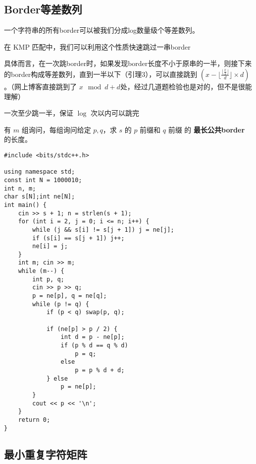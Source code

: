 \subsection{Border等差数列}
\par \noindent 一个字符串的所有border可以被我们分成log数量级个等差数列。
~\\
\par \noindent 在 KMP 匹配中，我们可以利用这个性质快速跳过一串border
~\\
\par \noindent 具体而言，在一次跳border时，如果发现border长度不小于原串的一半，则接下来的border构成等差数列，直到一半以下（引理3），可以直接跳到 $(x−\lfloor\frac{\lfloor\frac{x}{2}\rfloor}{d}\rfloor×d)$。（网上博客直接跳到了 $x\mod d+d$处，经过几道题检验也是对的，但不是很能理解）
~\\
\par \noindent 一次至少跳一半，保证 $\log$ 次以内可以跳完
~\\
\begin{tcolorbox}
\par 有 $m$ 组询问，每组询问给定 $p, q$，求 $s$ 的 $p$ 前缀和 $q$ 前缀 的 \textbf{最长公共border} 的长度。
\end{tcolorbox}
\begin{verbatim}
#include <bits/stdc++.h>

using namespace std;
const int N = 1000010;
int n, m;
char s[N];int ne[N];
int main() {
    cin >> s + 1; n = strlen(s + 1);
    for (int i = 2, j = 0; i <= n; i++) {
        while (j && s[i] != s[j + 1]) j = ne[j];
        if (s[i] == s[j + 1]) j++;
        ne[i] = j;
    }
    int m; cin >> m;
    while (m--) {
        int p, q;
        cin >> p >> q;
        p = ne[p], q = ne[q];
        while (p != q) {
            if (p < q) swap(p, q);

            if (ne[p] > p / 2) {
                int d = p - ne[p];
                if (p % d == q % d)
                    p = q;
                else
                    p = p % d + d;
            } else
                p = ne[p];
        }
        cout << p << '\n';
    }
    return 0;
}
\end{verbatim}
\subsection{最小重复字符矩阵}

